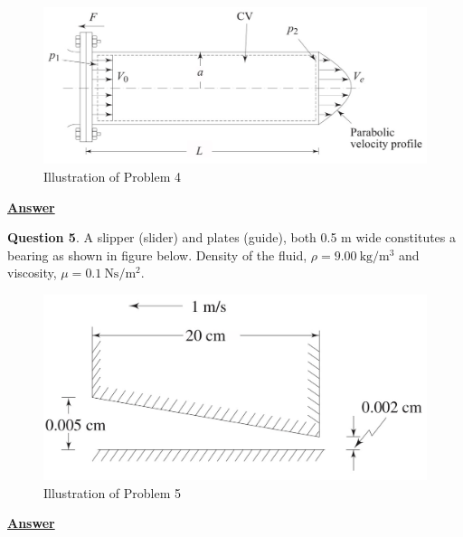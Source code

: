 \documentclass[10pt]{article}
\begin{document}
\begin{figure}[h]
    \centering
    \includegraphics[scale=0.83]{Problem4.jpg}
    \caption{Illustration of Problem 4}
    \label{fig:figprob4}
\end{figure}

\textbf{\underline{Answer}}

\break

\textbf{Question 5}. A slipper (slider) and plates (guide), both 0.5 m wide constitutes a bearing as shown in figure below. Density of the fluid, $\rho = 9.00\ \textrm{kg/}\textrm{m}^3$ and viscosity, $\mu = 0.1\ \textrm{Ns/}\textrm{m}^2$.

\begin{figure}[h]
    \centering
    \includegraphics[scale=0.83]{Problem5.jpg}
    \caption{Illustration of Problem 5}
    \label{fig:figprob5}
\end{figure}

\textbf{\underline{Answer}}
\end{document}
